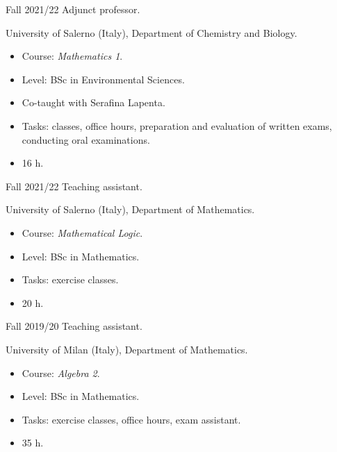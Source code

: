 \chronorow
  {Fall 2021/22}
  {Adjunct professor.}
  {\textcolor{secondary}{University of Salerno (Italy), Department of Chemistry and Biology.}
   \begin{itemize}
     \item Course: \emph{Mathematics 1}.
     \item Level: BSc in Environmental Sciences.
     \item Co-taught with Serafina Lapenta.
     \item Tasks: classes, office hours, preparation and evaluation of written exams, conducting oral
       examinations.
     \item 16 h.
   \end{itemize}}

\chronorow
  {Fall 2021/22}
  {Teaching assistant.}
  {\textcolor{secondary}{University of Salerno (Italy), Department of Mathematics.}
   \begin{itemize}
     \item Course: \emph{Mathematical Logic}.
     \item Level: BSc in Mathematics.
     \item Tasks: exercise classes.
     \item 20 h.
   \end{itemize}}

\chronorow
  {Fall 2019/20}
  {Teaching assistant.}
  {\textcolor{secondary}{University of Milan (Italy), Department of Mathematics.}
   \begin{itemize}
     \item Course: \emph{Algebra 2}.
     \item Level: BSc in Mathematics.
     \item Tasks: exercise classes, office hours, exam assistant.
     \item 35 h.
   \end{itemize}}

